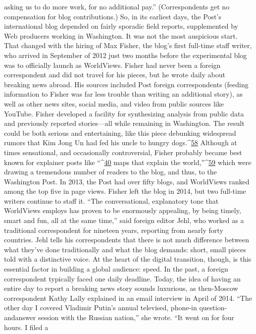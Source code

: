 asking us to do more work, for no additional pay.'' (Correspondents get no compensation
for blog contributions.) So, in its earliest days, the Post’s international blog depended on
fairly sporadic field reports, supplemented by Web producers working in Washington. It
was not the most auspicious start.
That changed with the hiring of Max Fisher, the blog’s first full-time staff writer, who
arrived in September of 2012 just two months before the experimental blog was to
officially launch as WorldViews. Fisher had never been a foreign correspondent and did
not travel for his pieces, but he wrote daily about breaking news abroad. His sources
included Post foreign correspondents (feeding information to Fisher was far less trouble
than writing an additional story), as well as other news sites, social media, and video
from public sources like YouTube.
Fisher developed a facility for synthesizing analysis from public data and previously
reported stories—all while remaining in Washington. The result could be both serious
and entertaining, like this piece debunking widespread rumors that Kim Jong Un had fed
his uncle to hungry dogs.^{\href{#endnotes}{58}} Although at times sensational, and occasionally controversial,
Fisher probably became best known for explainer posts like ``^{\href{#endnotes}{40}} maps that explain the
world,''^{\href{#endnotes}{59}} which were drawing a tremendous number of readers to the blog, and thus, to
the Washington Post. In 2013, the Post had over fifty blogs, and WorldViews ranked
among the top five in page views. Fisher left the blog in 2014, but two full-time writers
continue to staff it. ``The conversational, explanatory tone that WorldViews employs has
proven to be enormously appealing, by being timely, smart and fun, all at the same time,''
said foreign editor Jehl, who worked as a traditional correspondent for nineteen years,
reporting from nearly forty countries. Jehl tells his correspondents that there is not much
difference between what they’ve done traditionally and what the blog demands: short,
small pieces told with a distinctive voice.
At the heart of the digital transition, though, is this essential factor in building a global
audience: speed. In the past, a foreign correspondent typically faced one daily deadline.
Today, the idea of having an entire day to report a breaking news story sounds luxurious,
as then-Moscow correspondent Kathy Lally explained in an email interview in April of
2014. ``The other day I covered Vladimir Putin’s annual televised, phone-in question-andanswer
session with the Russian nation,'' she wrote. ``It went on for four hours. I filed a
